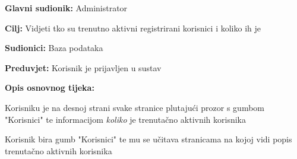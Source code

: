 					
					
					
					\noindent {}
					\begin{packed_item}
						
						\item \textbf{Glavni sudionik: } Administrator
						\item  \textbf{Cilj:} Vidjeti tko su trenutno aktivni registrirani korisnici i koliko ih je
						\item  \textbf{Sudionici:} Baza podataka
						\item  \textbf{Preduvjet:} Korisnik je prijavljen u sustav
						\item  \textbf{Opis osnovnog tijeka:}
						
						\item[] \begin{packed_enum}
							
							\item Korisniku je na desnoj strani svake stranice plutajući prozor s gumbom "Korisnici" te informacijom \textit{koliko} je trenutačno aktivnih korisnika
							\item Korisnik bira gumb "Korisnici" te mu se učitava stranicama na kojoj vidi popis trenutačno aktivnih korisnika
							
						\end{packed_enum}
						
					\end{packed_item}


